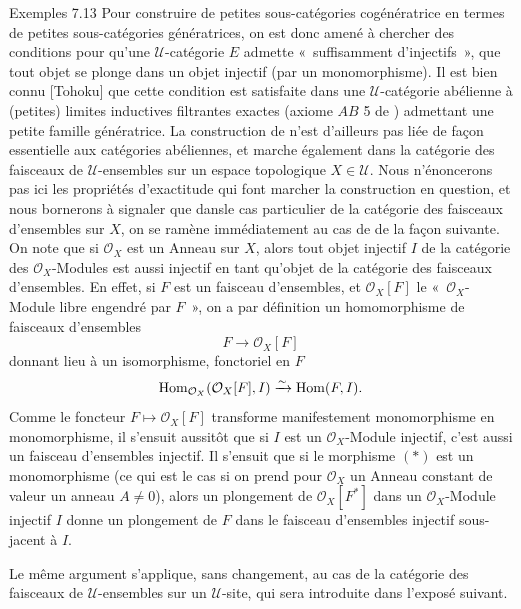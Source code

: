 \documentclass[10pt]{../fichiers-configuration-latex/smfart}
\begin{document}
\begin{enonce*}[remark]{Exemples 7.13}
Pour construire de petites sous-catégories cogénératrice en termes
de petites sous-catégories génératrices, on est donc amené à
chercher des conditions pour qu'une $𝒰$-catégorie $E$
admette « suffisamment d'injectifs », \ie que tout objet se
plonge dans un objet injectif (par un monomorphisme). Il est bien
connu [Tohoku] que cette condition est satisfaite dans une
$𝒰$-catégorie abélienne à (petites) limites inductives
filtrantes exactes (axiome $AB$ 5 de \loccit) admettant une petite
famille génératrice. La construction de \loccit n'est d'ailleurs pas
liée de façon essentielle aux catégories abéliennes, et marche
également dans la catégorie des faisceaux de $𝒰$-ensembles
sur un espace topologique $X\in 𝒰$. Nous n'énoncerons pas
ici les propriétés d'exactitude qui font marcher la construction en
question, et nous bornerons à signaler que dans\pageoriginale le cas
particulier de la catégorie des faisceaux d'ensembles sur $X$, on se
ramène immédiatement au cas de \loccit de la façon suivante. On note
que si $\mathcal{O}_X$ est un Anneau sur $X$, alors tout objet
injectif $I$ de la catégorie des $\mathcal{O}_X$-Modules est aussi
injectif en tant qu'objet de la catégorie des faisceaux d'ensembles.
En effet, si $F$ est un %
faisceau d'ensembles, et $\mathcal{O}_X[F]$ le « $\mathcal{O}_X$-Module libre engendré par $F$ », on a par
définition un homomorphisme de faisceaux d'ensembles
\begin{equation*}
F\longrightarrow \mathcal{O}_X[F]\tag{$\ast$}
\end{equation*}
donnant lieu à un isomorphisme, fonctoriel en $F$
$$
\operatorname{Hom}_{\mathcal{O}_X}(\mathcal{O}_X[F], I)\xrightarrow{\sim} \operatorname{Hom}
(F,I){}.
$$
Comme le foncteur $F\mapsto \mathcal{O}_X[F]$ transforme
manifestement monomorphisme en monomorphisme, il s'ensuit aussitôt
que si $I$ est un $\mathcal{O}_X$-Module injectif, c'est aussi un
faisceau d'ensembles injectif. Il s'ensuit que si le morphisme
$(\ast)$ est un monomorphisme (ce qui est le cas si on prend pour
$\mathcal{O}_X$ un Anneau constant de valeur un anneau $A\neq 0$),
alors un plongement de $\mathcal{O}_X[F^\ast]$ dans un
$\mathcal{O}_X$-Module injectif $I$ donne un plongement de $F$ dans
le faisceau d'ensembles injectif sous-jacent à $I$.
\end{enonce*}

Le même argument s'applique, sans changement, au cas de la catégorie
des faisceaux de $𝒰$-ensembles sur un $𝒰$-site, qui
sera introduite dans l'exposé suivant.
\end{document}
